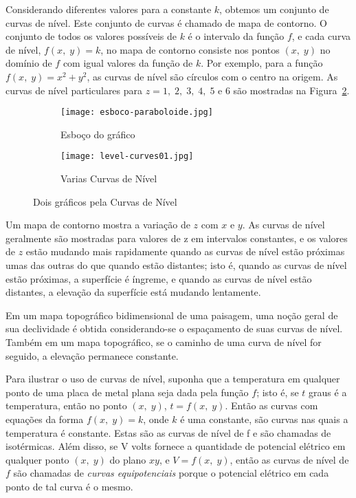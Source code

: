 Considerando diferentes valores para a constante \(k\), obtemos um conjunto de curvas de nível. Este conjunto de curvas é chamado de mapa de contorno. O 
conjunto de todos os valores possíveis de \(k\) é o intervalo da função \(f\), e cada curva de nível, \(f(x,\; y) = k\), no mapa de contorno consiste nos 
pontos \((x,\; y)\) no domínio de \(f\) com igual valores da função de \(k\). Por exemplo, para a função \(f(x,\; y)=x^2+y^2\), as curvas de nível são 
círculos com o centro na origem. As curvas de nível particulares para \(z=1,\; 2,\;3, \; 4,\; 5\) e \(6\) são mostradas na Figura~\ref{fig:17-1-7}.
%
\begin{figure}[H]
	\centering
	\begin{subfigure}[b]{0.45\textwidth}
		\centering
		\texttt{[image: esboco-paraboloide.jpg]}
		\caption{Esboço do gráfico}
		\label{fig:}
	\end{subfigure}
	\hfill
	\begin{subfigure}[b]{0.45\textwidth}
		\centering
		\texttt{[image: level-curves01.jpg]}
		\caption{Varias Curvas de Nível}
		\label{fig:17-1-7}
	\end{subfigure}
	\caption{Dois gráficos pela Curvas de Nível}
	\label{fig:two graphs}
\end{figure}
%
Um mapa de contorno mostra a variação de \(z\) com \(x\) e \(y\). As curvas de nível geralmente são mostradas para valores de z em intervalos constantes, 
e os valores de \(z\) estão mudando mais rapidamente quando as curvas de nível estão próximas umas das outras do que quando estão distantes; isto é, 
quando as curvas de nível estão próximas, a superfície é íngreme, e quando as curvas de nível estão distantes, a elevação da superfície está mudando 
lentamente.

Em um mapa topográfico bidimensional de uma paisagem, uma noção geral de sua declividade é obtida considerando-se o espaçamento de suas curvas de nível. 
Também em um mapa topográfico, se o caminho de uma curva de nível for seguido, a elevação permanece constante.

Para ilustrar o uso de curvas de nível, suponha que a temperatura em qualquer ponto de uma placa de metal plana seja dada pela função \(f\); isto é, se 
\(t\) graus é a temperatura, então no ponto \((x,\; y)\), \(t=f(x,\; y)\). Então as curvas com equações da forma \(f(x,\; y)=k\), onde \(k\) é uma 
constante, são curvas nas quais a temperatura é constante. Estas são as curvas de nível de f e são chamadas de isotérmicas. Além disso, se V volts fornece 
a quantidade de potencial elétrico em qualquer ponto \((x,\; y)\) do plano \(xy\), e \(V = f(x,\; y)\), então as curvas de nível de \(f\) são chamadas de 
\textit{curvas equipotenciais} porque o potencial elétrico em cada ponto de tal curva é o mesmo.

